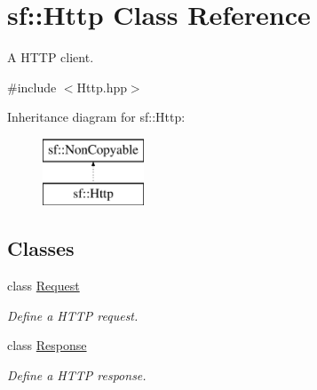 \hypertarget{classsf_1_1Http}{\section{sf\-:\-:Http Class Reference}
\label{classsf_1_1Http}
}


A H\-T\-T\-P client.  




{\ttfamily \#include $<$Http.\-hpp$>$}

Inheritance diagram for sf\-:\-:Http\-:\begin{figure}[H]
\begin{center}
\leavevmode
\includegraphics[height=2.000000cm]{classsf_1_1Http}
\end{center}
\end{figure}
\subsection*{Classes}
\begin{DoxyCompactItemize}
\item 
class \hyperlink{classsf_1_1Http_1_1Request}{Request}
\begin{DoxyCompactList}\small\item\em Define a H\-T\-T\-P request. \end{DoxyCompactList}\item 
class \hyperlink{classsf_1_1Http_1_1Response}{Response}
\begin{DoxyCompactList}\small\item\em Define a H\-T\-T\-P response. \end{DoxyCompactList}\end{DoxyCompactItemize}
